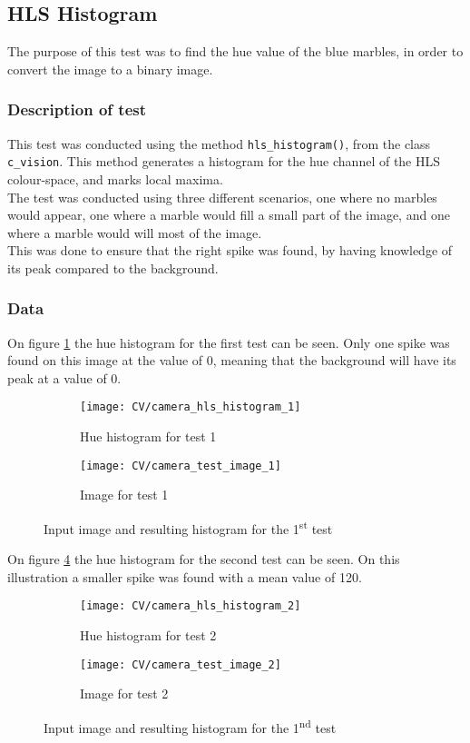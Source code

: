 \documentclass[../Head/Main.tex]{subfiles}
\begin{document}
\subsection{HLS Histogram}
\label{subsec:test_HLS_hist}
The purpose of this test was to find the hue value of the blue marbles, in order to convert the image to a binary image. 

\subsubsection*{Description of test}
This test was conducted using the method \texttt{hls\_histogram()}, from the class \texttt{c\_vision}. This method generates a histogram for the hue channel of the HLS colour-space, and marks local maxima.\\
The test was conducted using three different scenarios, one where no marbles would appear, one where a marble would fill a small part of the image, and one where a marble would will most of the image.\\
This was done to ensure that the right spike was found, by having knowledge of its peak compared to the background.  
\subsubsection*{Data}
On figure \ref{fig:hist_test_1} the hue histogram for the first test can be seen. Only one spike was found on this image at the value of 0, meaning that the background will have its peak at a value of 0. 

\begin{figure}[H]
	\centering
	\begin{subfigure}[b]{0.48\textwidth}
		\centering
		\texttt{[image: CV/camera\_hls\_histogram\_1]}
		\caption{Hue histogram for test 1}
		\label{fig:hist_test_1}
	\end{subfigure}
	\hfill
	\begin{subfigure}[b]{0.5\textwidth}
		\centering
		\texttt{[image: CV/camera\_test\_image\_1]}
		\caption{Image for test 1}
		\label{fig:image_test_1}
	\end{subfigure}
	\caption{Input image and resulting histogram for the 1\textsuperscript{st} test}
	\label{fig:test_1}
\end{figure}

On figure \ref{fig:hist_test_2} the hue histogram for the second test can be seen. On this illustration a smaller spike was found with a mean value of 120.
\begin{figure}[H]
	\centering
	\begin{subfigure}[b]{0.48\textwidth}
		\centering
		\texttt{[image: CV/camera\_hls\_histogram\_2]}
		\caption{Hue histogram for test 2}
		\label{fig:hist_test_2}
	\end{subfigure}
	\hfill
	\begin{subfigure}[b]{0.5\textwidth}
		\centering
		\texttt{[image: CV/camera\_test\_image\_2]}
		\caption{Image for test 2}
		\label{fig:image_test_2}
	\end{subfigure}
	\caption{Input image and resulting histogram for the 1\textsuperscript{nd} test}
	\label{fig:test_2}
\end{figure}
\end{document}
